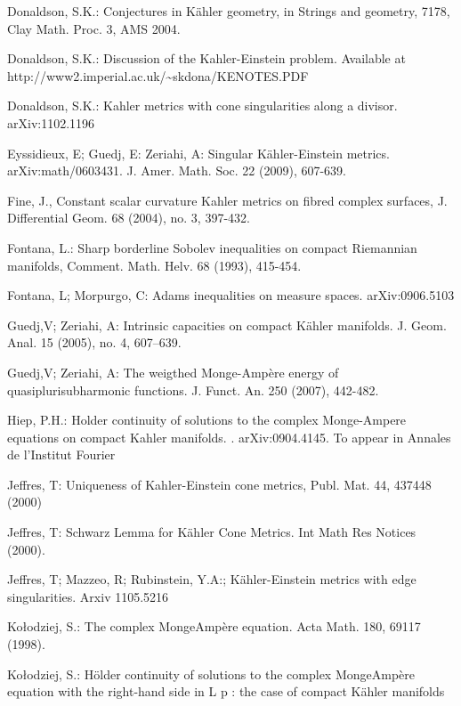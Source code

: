 \documentclass[11pt,oneside,english]{amsart}
\numberwithin{equation}{section}
\numberwithin{figure}{section}
\theoremstyle{plain}
\theoremstyle{plain}
\theoremstyle{plain}
\theoremstyle{plain}
\theoremstyle{remark}
\theoremstyle{definition}
\begin{document}
\begin{thebibliography}{10}
Donaldson, S.K.: Conjectures in Kähler geometry, in Strings
and geometry, 71\textendash{}78, Clay Math. Proc. 3, AMS 2004.

Donaldson, S.K.: \textquotedbl{}Discussion of the
Kahler-Einstein problem\textquotedbl{}. Available at http://www2.imperial.ac.uk/\textasciitilde{}skdona/KENOTES.PDF

Donaldson, S.K.: Kahler metrics with cone singularities
along a divisor. arXiv:1102.1196

Eyssidieux, E; Guedj, E: Zeriahi, A: Singular Kähler-Einstein
metrics. arXiv:math/0603431. J. Amer. Math. Soc. 22 (2009), 607-639.

Fine, J., Constant scalar curvature K\textasciidieresis{}ahler
metrics on fibred complex surfaces, J. Differential Geom. 68 (2004),
no. 3, 397-432.

Fontana, L.: Sharp borderline Sobolev inequalities
on compact Riemannian manifolds, Comment. Math. Helv. 68 (1993), 415-454.

Fontana, L; Morpurgo, C: Adams inequalities on measure
spaces. arXiv:0906.5103

Guedj,V; Zeriahi, A: Intrinsic capacities on compact
Kähler manifolds. J. Geom. Anal. 15 (2005), no. 4, 607--639.

Guedj,V; Zeriahi, A: The weigthed Monge-Ampère energy
of quasiplurisubharmonic functions. J. Funct. An. 250 (2007), 442-482.

Hiep, P.H.: Holder continuity of solutions to the complex
Monge-Ampere equations on compact Kahler manifolds. . arXiv:0904.4145.
To appear in Annales de l'Institut Fourier

Jeffres, T: Uniqueness of K\textasciidieresis{}ahler-Einstein
cone metrics, Publ. Mat. 44, 437\textendash{}448 (2000)

Jeffres, T: Schwarz Lemma for Kähler Cone Metrics. Int
Math Res Notices (2000).

Jeffres, T; Mazzeo, R; Rubinstein, Y.A:; Kähler-Einstein
metrics with edge singularities. Arxiv 1105.5216

Ko\l{}odziej, S.: The complex Monge\textendash{}Ampère
equation. Acta Math. 180, 69\textendash{}117 (1998).

Ko\l{}odziej, S.: Hölder continuity of solutions to
the complex Monge\textendash{}Ampère equation with the right-hand
side in L p : the case of compact Kähler manifolds


\end{thebibliography}
\end{document}
